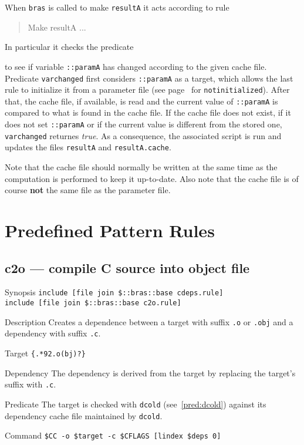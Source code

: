 \documentclass[11pt,bibtotoc,idxtotoc]{scrreprt}
\makeatletter
\newcommand{\bras}{\texttt{bras}}
\newcommand{\indextt}[1]{\index{#1@\texttt{#1}}}
\makeatother
\begin{document}
\begin{Describe}
  When \bras{} is called to make \texttt{resultA} it acts according to
  rule 
  \begin{quote}
    \ttfamily Make resultA ...
  \end{quote}
  In particular it checks the predicate 
  \begin{quote}
  \end{quote}
  to see if variable \texttt{::paramA} has changed according to the
  given cache file. Predicate \texttt{varchanged} first
  considers \texttt{::paramA} as a target, which allows the last rule
  to initialize it from a parameter file (see
  page~\pageref{pred:notinitialized} for
  \texttt{notinitialized}). After that, the cache file, if available,
  is read and the current value of \texttt{::paramA} is compared to
  what is found in the cache file. If the cache file does not exist,
  if it does not set \texttt{::paramA} or if the current value is
  different from the stored one, \texttt{varchanged} returnes
  \textit{true}. As a consequence, the associated script is run and
  updates the files \texttt{resultA} and \texttt{resultA.cache}.

  Note that the cache file should normally be written at the same time 
  as the computation is performed to keep it up-to-date. Also note
  that the cache file is of course \textbf{not} the same file as the
  parameter file.
\end{Describe}
\section{Predefined Pattern Rules}
\label{sec:rules}

\subsection{c2o --- compile C source into object file}
\label{sec:c2o}

\begin{Describe}
\item[Synopsis] \texttt{include [file join \$::bras::base cdeps.rule]}\\
\texttt{include [file join \$::bras::base c2o.rule]}
\item[Description] Creates a dependence between a target with suffix
  \texttt{.o} or \texttt{.obj} and a dependency with suffix
  \texttt{.c}. 
\item[Target] \texttt{\{.*\char92.o(bj)?\}}
\item[Dependency] The dependency is derived from the target by
  replacing the target's suffix with \texttt{.c}.
\item[Predicate] The target is checked with \texttt{dcold}
  (see~\ref{pred:dcold}) against its dependency cache file maintained
  by \texttt{dcold}.
\item[Command] \texttt{\$CC -o \$target -c \$CFLAGS [lindex \$deps 0]}
\indextt{CC}\indextt{CFLAGS}
\end{Describe}
\end{document}
